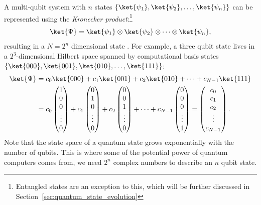 \documentclass[a4paper,10pt]{article}
\begin{document}
A multi-qubit system with $n$ states $\{\ket{\psi_1}, \ket{\psi_2}, \ldots, \ket{\psi_n}\}$ can be represented using the \emph{Kronecker product}:\footnote{Entangled states are an exception to this, which will be further discussed in Section~\ref{sec:quantum_state_evolution}}
\begin{equation}
\ket{\Psi} = \ket{\psi_1} \otimes \ket{\psi_2} \otimes \dotsm \otimes \ket{\psi_n},
\end{equation}
resulting in a $N = 2^n$ dimensional state \ket{\Psi}.
For example, a three qubit state lives in a  $2^3$-dimensional Hilbert space spanned by computational basis states $\{\ket{000}, \ket{001}, \ket{010}, \ldots, \ket{111}\}$:
\begin{equation}
\begin{aligned}
\ket{\Psi} &= c_0\ket{000} + c_1\ket{001} + c_2\ket{010} + \dotsm + c_{N-1}\ket{111} \\
&= c_0\begin{pmatrix}1 \\ 0 \\ 0 \\ \vdots \\ 0\end{pmatrix} + c_1\begin{pmatrix}0 \\ 1 \\ 0 \\ \vdots \\ 0\end{pmatrix} + c_2\begin{pmatrix}0 \\ 0 \\ 1 \\ \vdots \\ 0\end{pmatrix} + \dotsm + c_{N-1}\begin{pmatrix}0 \\ 0 \\ 0 \\ \vdots \\ 1\end{pmatrix} = \begin{pmatrix}c_0 \\ c_1 \\ c_2 \\ \vdots \\ c_{N-1}\end{pmatrix}.
\end{aligned}
\end{equation}
Note that the state space of a quantum state grows exponentially with the number of qubits.
This is where some of the potential power of quantum computers comes from, we need $2^n$ complex numbers to describe an $n$ qubit state.
\end{document}
